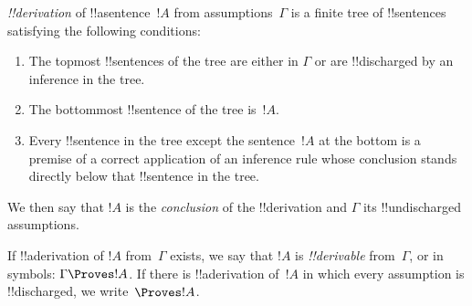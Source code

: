 \begin{defn}[!!^{derivation}]
 \emph{!!{derivation}} of !!a{sentence}~$!A$ from
assumptions~$\Gamma$ is a finite tree of !!{sentence}s satisfying the
following conditions:
\begin{enumerate}
\item The topmost !!{sentence}s of the tree are either in $\Gamma$ or
  are !!{discharged} by an inference in the tree.
\item The bottommost !!{sentence} of the tree is~$!A$.
\item Every !!{sentence} in the tree except the sentence~$!A$ at
  the bottom is a premise of a correct application of an inference
  rule whose conclusion stands directly below that !!{sentence} in the
  tree.
\end{enumerate}
We then say that $!A$ is the \emph{conclusion} of the !!{derivation}
and $\Gamma$ its !!{undischarged} assumptions.

If !!a{derivation} of $!A$ from~$\Gamma$ exists, we say that $!A$ is
\emph{!!{derivable}} from~$\Gamma$, or in symbols: $\Gamma \Proves
!A$. If there is !!a{derivation} of~$!A$ in which every assumption is
!!{discharged}, we write~$\Proves !A$.
\end{defn}

